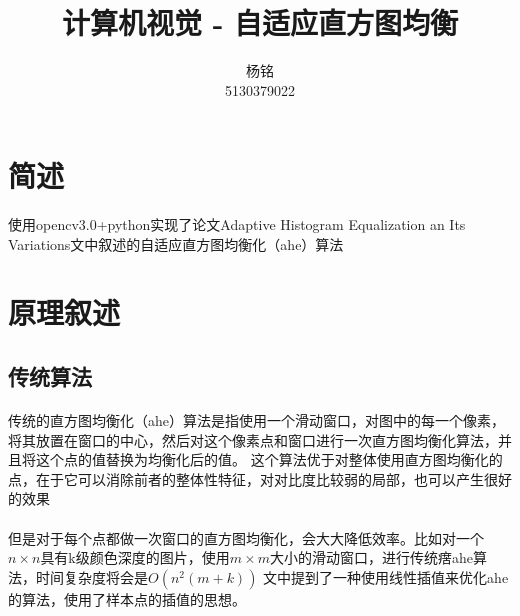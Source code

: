 \documentclass{article}
\author{杨铭\\5130379022}
\title{计算机视觉 - 自适应直方图均衡}
\begin{document}
    \maketitle
    \tableofcontents
    \section{简述}
    \paragraph{}
    使用opencv3.0+python实现了论文Adaptive Histogram Equalization an Its Variations文中叙述的自适应直方图均衡化（ahe）算法
    \section{原理叙述}
        \subsection{传统算法}
        \paragraph{}传统的直方图均衡化（ahe）算法是指使用一个滑动窗口，对图中的每一个像素，将其放置在窗口的中心，然后对这个像素点和窗口进行一次直方图均衡化算法，并且将这个点的值替换为均衡化后的值。
        这个算法优于对整体使用直方图均衡化的点，在于它可以消除前者的整体性特征，对对比度比较弱的局部，也可以产生很好的效果
        \paragraph{}但是对于每个点都做一次窗口的直方图均衡化，会大大降低效率。比如对一个$n\times n$具有k级颜色深度的图片，使用$m\times m$大小的滑动窗口，进行传统瘔ahe算法，时间复杂度将会是$O(n^{2}(m+k))$
        文中提到了一种使用线性插值来优化ahe的算法，使用了样本点的插值的思想。
\end{document}
